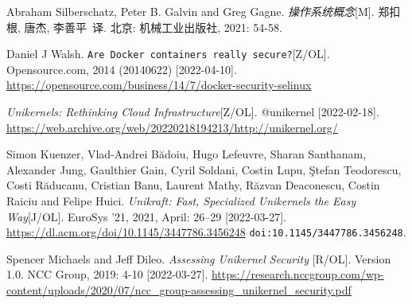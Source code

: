 \documentclass[UTF8,fontset=none,linespread=1.15]{ctexart}
\begin{document}
\begin{thebibliography}{99}
 Abraham Silberschatz, Peter B. Galvin and Greg Gagne.
\textit{操作系统概念}[M]. 郑扣根, 唐杰, 李善平\ 译. 北京: 机械工业出版社, 2021: 54-58.

 Daniel J Walsh. \texttt{Are Docker containers really secure?}[Z/OL]. Opensource.com, 2014 (20140622) [2022-04-10]. \url{https://opensource.com/business/14/7/docker-security-selinux}

\textit{Unikernels: Rethinking Cloud Infrastructure}[Z/OL].
@unikernel [2022-02-18]. \url{https://web.archive.org/web/20220218194213/http://unikernel.org/}

 Simon Kuenzer, Vlad-Andrei Bădoiu, Hugo Lefeuvre, Sharan Santhanam,
Alexander Jung, Gaulthier Gain, Cyril Soldani, Costin Lupu, \c{S}tefan Teodorescu, Costi Răducanu,
Cristian Banu, Laurent Mathy, Răzvan Deaconescu, Costin Raiciu and Felipe Huici.
\textit{Unikraft: Fast, Specialized Unikernels the Easy Way}[J/OL]. EuroSys '21, 2021, April: 26–29
[2022-03-27]. \url{https://dl.acm.org/doi/10.1145/3447786.3456248} \texttt{doi:10.1145/3447786.3456248}.

 Spencer Michaels and Jeff Dileo. \textit{Assessing Unikernel Security
}[R/OL]. Version 1.0. NCC Group, 2019: 4-10 [2022-03-27].
\url{https://research.nccgroup.com/wp-content/uploads/2020/07/ncc_group-assessing_unikernel_security.pdf}


\end{thebibliography}
\end{document}

